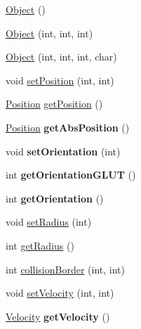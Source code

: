 \begin{DoxyCompactItemize}
\item 
\hyperlink{classObject_a40860402e64d8008fb42329df7097cdb}{Object} ()
\item 
\hyperlink{classObject_a43ed9b32c482cf0db8bf2d3660feb5f0}{Object} (int, int, int)
\item 
\hyperlink{classObject_ad1af0861169e7b34efc6c86ff971872f}{Object} (int, int, int, char)
\item 
void \hyperlink{classObject_aec33bdfdbb4d45f6060f409a1662134d}{set\-Position} (int, int)
\item 
\hyperlink{structPosition}{Position} \hyperlink{classObject_a3d27536422e7792a3fa7b34ab9862ec4}{get\-Position} ()
\item 
\hypertarget{classObject_ac81f42238b7adaf527b79a5411ca9705}{\hyperlink{structPosition}{Position} {\bfseries get\-Abs\-Position} ()}\label{classObject_ac81f42238b7adaf527b79a5411ca9705}

\item 
\hypertarget{classObject_abbcebc4287c71f92a6f50392bdf9da77}{void {\bfseries set\-Orientation} (int)}\label{classObject_abbcebc4287c71f92a6f50392bdf9da77}

\item 
\hypertarget{classObject_a69d00971216903be3793b082458d0bd9}{int {\bfseries get\-Orientation\-G\-L\-U\-T} ()}\label{classObject_a69d00971216903be3793b082458d0bd9}

\item 
\hypertarget{classObject_a34ad252eded3300ffe5119e768a082a1}{int {\bfseries get\-Orientation} ()}\label{classObject_a34ad252eded3300ffe5119e768a082a1}

\item 
void \hyperlink{classObject_a2143ff47aab9b29336dba6194027edeb}{set\-Radius} (int)
\item 
int \hyperlink{classObject_a82840223125a721f50228530b9b4105f}{get\-Radius} ()
\item 
int \hyperlink{classObject_a60b3199915a0529e3cedd228ae68b913}{collision\-Border} (int, int)
\item 
void \hyperlink{classObject_aaf387599b25880d13058c62091ef739d}{set\-Velocity} (int, int)
\item 
\hypertarget{classObject_ac273a6182758926b972b1e9d73fbf562}{\hyperlink{structVelocity}{Velocity} {\bfseries get\-Velocity} ()}\label{classObject_ac273a6182758926b972b1e9d73fbf562}


\end{DoxyCompactItemize}
